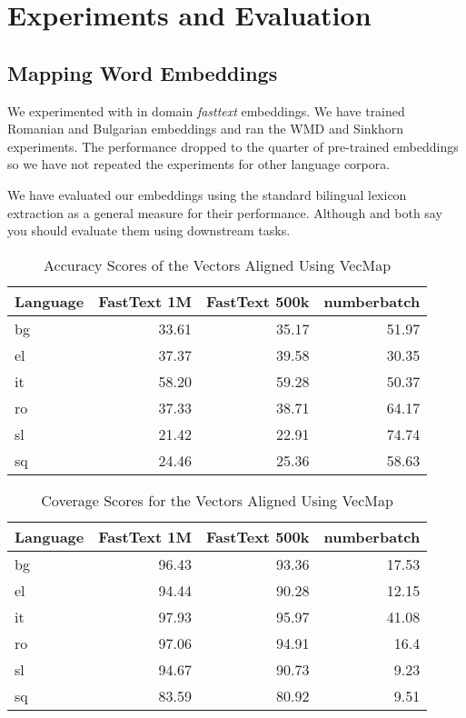 
\chapter{Experiments and Evaluation}%
\label{chap:experiments_and_evaluation}

\section{Mapping Word Embeddings}%
\label{sec:mapping_word_embeddings}

We experimented with in domain \emph{fasttext} embeddings.
We have trained Romanian and Bulgarian embeddings and ran the WMD and Sinkhorn experiments.
The performance dropped to the quarter of pre-trained embeddings so we have not repeated the experiments for other language corpora.

We have evaluated our embeddings using the standard bilingual lexicon extraction as a general measure for their performance.
Although \textcite{ruder_survey_2017} and \textcite{glavas_how_2019} both say you should evaluate them using downstream tasks.

\begin{table}[htbp]
    \centering
    \begin{tabular}{lrrr}
        \toprule
        \textbf{Language} & \textbf{FastText 1M} & \textbf{FastText 500k} & \textbf{numberbatch} \\
        \midrule
        bg & 33.61 & 35.17 & 51.97 \\
        el & 37.37 & 39.58 & 30.35 \\
        it & 58.20 & 59.28 & 50.37 \\
        ro & 37.33 & 38.71 & 64.17 \\
        sl & 21.42 & 22.91 & 74.74 \\
        sq & 24.46 & 25.36 & 58.63 \\
        \bottomrule
    \end{tabular}
    \caption{Accuracy Scores of the Vectors Aligned Using VecMap}%
    \label{tab:accuracy_results}
\end{table}

\begin{table}[htbp]
    \centering
    \begin{tabular}{lrrr}
        \toprule
        \textbf{Language} & \textbf{FastText 1M} & \textbf{FastText 500k} & \textbf{numberbatch} \\
        \midrule
        bg & 96.43 & 93.36 & 17.53 \\
        el & 94.44 & 90.28 & 12.15 \\
        it & 97.93 & 95.97 & 41.08 \\
        ro & 97.06 & 94.91 & 16.4 \\
        sl & 94.67 & 90.73 & 9.23 \\
        sq & 83.59 & 80.92 & 9.51 \\
        \bottomrule
    \end{tabular}
    \caption{Coverage Scores for the Vectors Aligned Using VecMap}%
    \label{tab:coverage_results}
\end{table}



